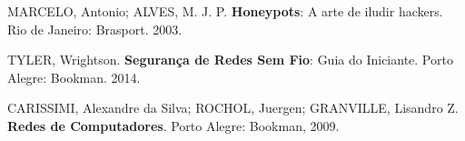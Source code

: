 \documentclass[article,12pt,oneside,a4paper,english,brazil]{unifil}
\begin{document}
\begin{thebibliography}{99}

\bibitem{}
{MARCELO, Antonio; ALVES, M. J. P. \textbf{Honeypots}: A arte de iludir hackers. Rio de Janeiro: Brasport. 2003. }

\bibitem{}
{TYLER, Wrightson. \textbf{Segurança de Redes Sem Fio}: Guia do Iniciante. Porto Alegre: Bookman. 2014. }

\bibitem{}
{CARISSIMI, Alexandre da Silva; ROCHOL, Juergen; GRANVILLE, Lisandro Z. \textbf{Redes de Computadores}. Porto Alegre: Bookman, 2009. }

\end{thebibliography}
\end{document}
